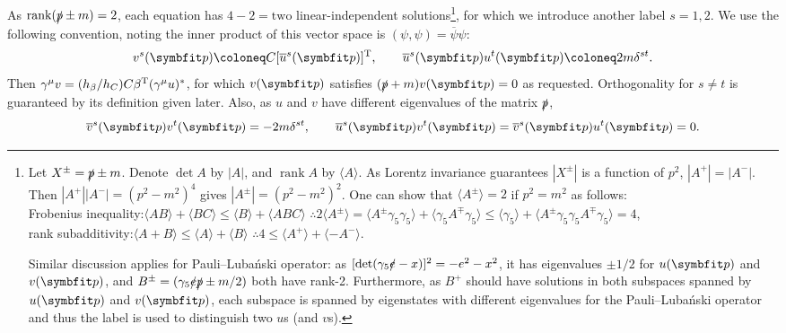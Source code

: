 \documentclass{CheatSheet}
\newcommand{\Lubanski}{Luba\'nski\xspace}
\DeclareMathOperator\rank{\mathrm{rank}}
\newcommand{\RANK}[1]{\langle #1\rangle}
\begin{document}
As $\rank(\slashed p\pm m)=2$, each equation has $4-2 = \text{two}$ linear-independent solutions\footnote{%
  Let $X^\pm=\slashed{p}\pm m$. Denote $\det A$ by $|A|$, and $\rank A$ by $\RANK{A}$.
  As Lorentz invariance guarantees $|X^\pm|$ is a function of $p^2$, $|A^+|=|A^-|$.
  Then $|A^+||A^-| = (p^2-m^2)^4$ gives $|A^\pm|=(p^2-m^2)^2$.
  One can show that $\RANK{A^\pm}=2$ if $p^2=m^2$ as follows:
\\%
Frobenius inequality:\qquad $\RANK{AB}+\RANK{BC}\le \RANK B + \RANK{ABC}$\qquad
$\therefore 2\RANK{A^\pm}=\RANK{A^\pm\gamma_5\gamma_5} + \RANK{\gamma_5A^\mp\gamma_5} \le \RANK{\gamma_5}+\RANK{A^\pm\gamma_5\gamma_5A^\mp\gamma_5}=4$,
\\%
rank subadditivity:\qquad$\RANK{A+B}\le\RANK{A}+\RANK{B}$\qquad
$\therefore4\le\RANK{A^+}+\RANK{-A^-}.$

Similar discussion applies for Pauli--\Lubanski operator: as $[\det(\gamma_5\slashed{e}-x)]^2=-e^2-x^2$, it has eigenvalues $\pm1/2$ for $u(\vc p)$ and $v(\vc p)$, and 
$B^\pm=(\gamma_5\slashed e\slashed p\pm m/2)$ both have rank-2.
Furthermore, \TOCHECK as $B^+$ should have solutions in both subspaces spanned by $u(\vc p)$ and $v(\vc p)$, each subspace is spanned by eigenstates with different eigenvalues for the Pauli--\Lubanski operator and thus the label is used to distinguish two $u$s (and $v$s).
}, for which we introduce another label $s=1,2$.
We use the following convention, noting the inner product of this vector space is $(\psi,\psi)=\overline\psi\psi$:
\begin{equation}
 v^s(\vc p)\coloneq C[\overline{u}^s(\vc p)]^\TT,\qquad
 \overline u^s(\vc p)u^t(\vc p)\coloneq 2m\delta^{st}.
\end{equation}
Then $\gamma^\mu v = (h_\beta/h_C)C\beta^{\mathrm{T}}(\gamma^\mu u)^*$, for which $v(\vc p)$ satisfies $(\slashed{p}+m)v(\vc p)=0$ as requested.
Orthogonality for $s\neq t$ is guaranteed by its definition given later.
Also, as $u$ and $v$ have different eigenvalues of the matrix $\slashed p$,
\begin{equation}
  \overline v^s(\vc p)v^t(\vc p)=-2m\delta^{st},\qquad
 \overline u^s(\vc p)v^t(\vc p)=\overline v^s(\vc p)u^t(\vc p)=0.
\end{equation}
\end{document}
